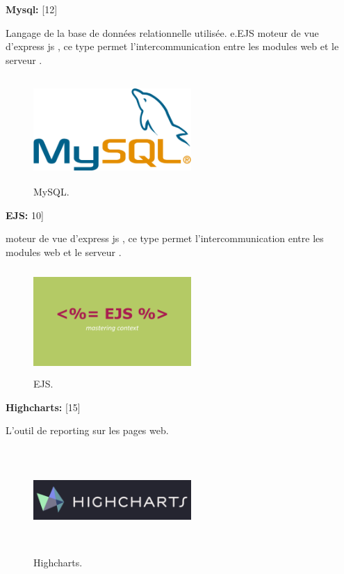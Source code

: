 \textbf{ Mysql:} [12]

Langage de la base de donn\'{e}es relationnelle utilis\'{e}e.
e.EJS moteur de vue d'express js , ce type permet l'intercommunication entre
les modules web et le serveur . \newline
\FloatBarrier
\begin{figure}[H]
\center
\includegraphics[width=6cm,height=4cm]{./figures/teklogos/mysql.png}
\caption{MySQL.}
\end{figure}
\FloatBarrier

\textbf{ EJS:} 10]

moteur de vue d'express js , ce type permet l'intercommunication entre
les modules web et le serveur . \newline
\FloatBarrier
\begin{figure}[H]
\center
\includegraphics[width=6cm,height=4cm]{./figures/teklogos/ejs.png}
\caption{EJS.}
\end{figure}
\FloatBarrier


\textbf{ Highcharts: }  [15]

L'outil de \guillemotleft{} reporting \guillemotright{} sur les pages web.


\FloatBarrier
\begin{figure}[H]
\center
\includegraphics[width=6cm,height=4cm]{./figures/teklogos/highcharts.png}
\caption{Highcharts.}
\end{figure}
\FloatBarrier
























